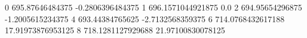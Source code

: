 0 695.87646484375 -0.2806396484375
1 696.1571044921875 0.0
2 694.95654296875 -1.2005615234375
4 693.44384765625 -2.7132568359375
6 714.0768432617188 17.91973876953125
8 718.1281127929688 21.97100830078125
